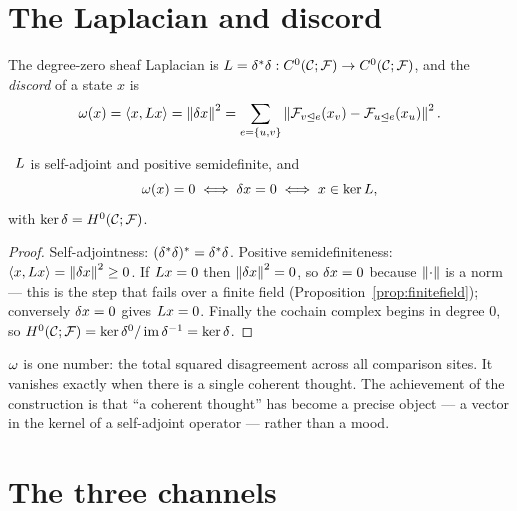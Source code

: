 \section{The Laplacian and discord}

\begin{definition}\label{def:laplacian}
The degree-zero sheaf Laplacian is
$L=\delta^{\ast}\delta:C^{0}(\mathcal{C};\mathcal{F})\to C^{0}(\mathcal{C};\mathcal{F})$, and the \emph{discord} of a state
$x$ is
\begin{equation}\label{eq:omega}
  \omega(x)=\left\langle x,L x\right\rangle=\left\lVert \delta x \right\rVert^2
  =\sum_{e=\{u,v\}}
   \left\lVert \mathcal{F}_{v\trianglelefteq e}(x_v)-\mathcal{F}_{u\trianglelefteq e}(x_u) \right\rVert^2 .
\end{equation}
\end{definition}

\begin{proposition}\label{prop:Lpsd}
\Proved\ $L$ is self-adjoint and positive semidefinite, and
\[
  \omega(x)=0\iff\delta x=0\iff x\in\ker L,
\]
with $\ker\delta=H^{0}(\mathcal{C};\mathcal{F})$.
\end{proposition}
\begin{proof}
Self-adjointness: $(\delta^{\ast}\delta)^{\ast}=\delta^{\ast}\delta$. Positive
semidefiniteness: $\left\langle x,L x\right\rangle=\left\lVert \delta x \right\rVert^2\ge0$. If $L x=0$ then
$\left\lVert \delta x \right\rVert^2=0$, so $\delta x=0$ because $\left\lVert \cdot \right\rVert$ is a norm --- this
is the step that fails over a finite field
(Proposition~\ref{prop:finitefield}); conversely $\delta x=0$ gives $L x=0$.
Finally the cochain complex begins in degree $0$, so
$H^{0}(\mathcal{C};\mathcal{F})=\ker\delta^0/\operatorname{im}\delta^{-1}=\ker\delta$.
\end{proof}

\begin{intu}\Intu
$\omega$ is one number: the total squared disagreement across all
comparison sites. It vanishes exactly when there is a single coherent thought.
The achievement of the construction is that ``a coherent thought'' has become
a precise object --- a vector in the kernel of a self-adjoint operator ---
rather than a mood.
\end{intu}

\section{The three channels}

